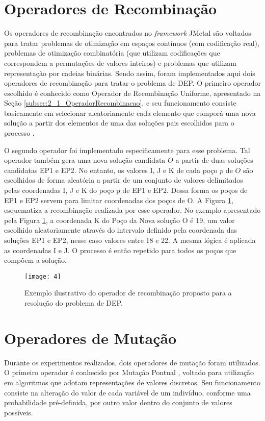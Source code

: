 \section{Operadores de Recombinação}
\label{sec:3_OperadorRecombinacao}
Os operadores de recombinação encontrados no \textit{framework} JMetal são voltados para tratar problemas de otimização em espaços contínuos (com codificação real), problemas de otimização combinatória (que utilizam codificações que correspondem a permutações de valores inteiros) e problemas que utilizam representação por cadeias binárias. Sendo assim, foram implementados aqui dois operadores de recombinação para tratar o problema de DEP. O primeiro operador escolhido é conhecido como Operador de Recombinação Uniforme, apresentado na Seção \ref{subsec:2_1_OperadorRecombinacao}, e seu funcionamento consiste basicamente em selecionar aleatoriamente cada elemento que comporá uma nova solução a partir dos elementos de uma das soluções pais escolhidos para o processo \cite{Talbi2009, Kacprzyk2015}.

O segundo operador foi implementado especificamente para esse problema.  Tal operador também gera uma nova solução candidata $O$ a partir de duas soluções candidatas EP1 e EP2. No entanto, os valores I, J e K de cada poço $p$ de $O$ são escolhidos de forma aleatória a partir de um conjunto de valores delimitados pelas coordenadas I, J e K do poço p de EP1 e EP2. Dessa forma os poços de EP1 e EP2 servem para limitar coordenadas dos poços de O. A Figura \ref{fig:fig3_2}, esquematiza a recombinação realizada por esse operador. No exemplo apresentado pela Figura \ref{fig:fig3_2}, a coordenada K do Poço da Nova solução O é 19, um valor escolhido aleatoriamente através do intervalo definido pela coordenada das soluções EP1 e EP2, nesse caso valores entre 18 e 22. A mesma lógica é aplicada as coordenadas I e J. O processo é então repetido para todos os poços que compõem a solução.

\begin{figure}[!htbp]
  \centering
  \texttt{[image: 4]}
  \caption{Exemplo ilustrativo do operador de recombinação proposto para a resolução do problema de DEP.}
  \label{fig:fig3_2}
\end{figure}

\section{Operadores de Mutação}
\label{sec:3_OperadorMutacao}
Durante os experimentos realizados, dois operadores de mutação foram utilizados. O primeiro operador é conhecido por Mutação Pontual \cite{Kacprzyk2015}, voltado para utilização em algoritmos que adotam representações de valores discretos. Seu funcionamento consiste na alteração do valor de cada variável de um indivíduo, conforme uma probabilidade pré-definida, por outro valor dentro do conjunto de valores possíveis.

